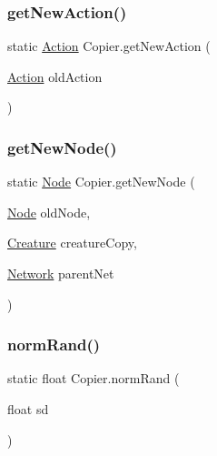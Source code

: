 \mbox{\label{class_copier_a12cae9390220b2dcee8472e3ab5ec38f}} 
\subsubsection{\texorpdfstring{get\+New\+Action()}{getNewAction()}}
{\footnotesize\ttfamily static \mbox{\hyperlink{class_action}{Action}} Copier.\+get\+New\+Action (\begin{DoxyParamCaption}\item[{\mbox{\hyperlink{class_action}{Action}}}]{old\+Action }\end{DoxyParamCaption})\hspace{0.3cm}{\ttfamily [static]}}

\mbox{\label{class_copier_a2bc3b60cb77fb710cf7e4802ceb16d03}} 
\subsubsection{\texorpdfstring{get\+New\+Node()}{getNewNode()}}
{\footnotesize\ttfamily static \mbox{\hyperlink{class_node}{Node}} Copier.\+get\+New\+Node (\begin{DoxyParamCaption}\item[{\mbox{\hyperlink{class_node}{Node}}}]{old\+Node,  }\item[{\mbox{\hyperlink{class_creature}{Creature}}}]{creature\+Copy,  }\item[{\mbox{\hyperlink{class_network}{Network}}}]{parent\+Net }\end{DoxyParamCaption})\hspace{0.3cm}{\ttfamily [static]}}

\mbox{\label{class_copier_a187d00289a5f7c8d3b2d20a3468e9416}} 
\subsubsection{\texorpdfstring{norm\+Rand()}{normRand()}}
{\footnotesize\ttfamily static float Copier.\+norm\+Rand (\begin{DoxyParamCaption}\item[{float}]{sd }\end{DoxyParamCaption})\hspace{0.3cm}{\ttfamily [static]}}



